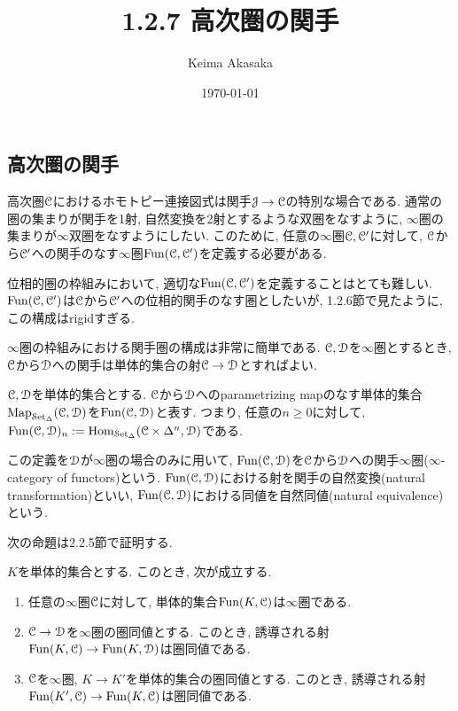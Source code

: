 \documentclass[uplatex, a4paper, 14Q, dvipdfmx]{jsreport}
\title{1.2.7 高次圏の関手}
\author{Keima Akasaka}
\date{\today}
\begin{document}

\setcounter{chapter}{1}
\setcounter{section}{2} 
\setcounter{subsection}{6}   
\setcounter{subsubsection}{1}

\subsection{高次圏の関手}

高次圏$\mathcal{C}$におけるホモトピー連接図式は関手$\mathcal{J} \to \mathcal{C}$の特別な場合である. 
通常の圏の集まりが関手を1射, 自然変換を2射とするような双圏をなすように, $\infty$圏の集まりが$\infty$双圏をなすようにしたい. 
このために, 任意の$\infty$圏$\mathcal{C},\mathcal{C}'$に対して, $\mathcal{C}$から$\mathcal{C}'$への関手のなす$\infty$圏$\mathrm{Fun}(\mathcal{C},\mathcal{C}')$を定義する必要がある. 

位相的圏の枠組みにおいて, 適切な$\mathrm{Fun}(\mathcal{C},\mathcal{C}')$を定義することはとても難しい. 
$\mathrm{Fun}(\mathcal{C},\mathcal{C}')$は$\mathcal{C}$から$\mathcal{C}'$への位相的関手のなす圏としたいが, 1.2.6節で見たように, この構成はrigidすぎる. 

$\infty$圏の枠組みにおける関手圏の構成は非常に簡単である. 
$\mathcal{C},\mathcal{D}$を$\infty$圏とするとき, $\mathcal{C}$から$\mathcal{D}$への関手は単体的集合の射$\mathcal{C} \to \mathcal{D}$とすればよい. 

\begin{definition}[関手$\infty$圏]
  $\mathcal{C},\mathcal{D}$を単体的集合とする. 
  $\mathcal{C}$から$\mathcal{D}$へのparametrizing mapのなす単体的集合$\mathrm{Map}_{\mathcal{S}\mathrm{et}_{\Delta}}(\mathcal{C},\mathcal{D})$を$\mathrm{Fun}(\mathcal{C},\mathcal{D})$と表す. 
  つまり, 任意の$n \geq 0$に対して, $\mathrm{Fun}(\mathcal{C},\mathcal{D})_n := \mathrm{Hom}_{\mathcal{S}\mathrm{et}_{\Delta}}(\mathcal{C} \times \Delta^n, \mathcal{D})$である.  

  この定義を$\mathcal{D}$が$\infty$圏の場合のみに用いて, $\mathrm{Fun}(\mathcal{C},\mathcal{D})$を$\mathcal{C}$から$\mathcal{D}$への関手$\infty$圏($\infty$-category of functors)という. 
  $\mathrm{Fun}(\mathcal{C},\mathcal{D})$における射を関手の自然変換(natural transformation)といい, $\mathrm{Fun}(\mathcal{C},\mathcal{D})$における同値を自然同値(natural equivalence)という. 
\end{definition}

次の命題は2.2.5節で証明する.

\begin{proposition} \label{prop.1.2.7.3}
  $K$を単体的集合とする. 
  このとき, 次が成立する. 
  \begin{enumerate}
    \item 任意の$\infty$圏$\mathcal{C}$に対して, 単体的集合$\mathrm{Fun}(K,\mathcal{C})$は$\infty$圏である.
    \item $\mathcal{C} \to \mathcal{D}$を$\infty$圏の圏同値とする. 
    このとき, 誘導される射$\mathrm{Fun}(K,\mathcal{C}) \to \mathrm{Fun}(K,\mathcal{D})$は圏同値である. 
    \item $\mathcal{C}$を$\infty$圏, $K \to K'$を単体的集合の圏同値とする. 
    このとき, 誘導される射$\mathrm{Fun}(K',\mathcal{C}) \to \mathrm{Fun}(K,\mathcal{C})$は圏同値である. 
  \end{enumerate}
\end{proposition}
\end{document}
